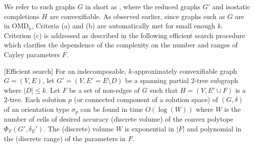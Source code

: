 
We refer to such graphs $G$ in short as , where the reduced graphs $G'$ and isostatic completions $H$ are convexifiable. As observed earlier, since graphs such as $G$ are in OMD$_k$, Criteria (a) and (b) are automatically met for small enough $k$. Criterion (c) is addressed as described in the following efficient search procedure which clarifies the dependence of the complexity on the number and ranges  of Cayley parameters $F$.

\begin{theorem*}\label{theorem:criterionc}
    [Efficient search]
    For an indecomposable, $k$-approximately convexifiable graph $G = (V,E)$, let $G' = (V,E' =E\setminus D)$ be a spanning partial 2-tree subgraph where $|D| \le  k$. Let  $F$ be a set of non-edges of $G$ such that $H = (V, E'\cup F)$ is a 2-tree. Each solution $p$ (or connected component of a solution space) of $(G,\delta)$ of an orientation type $\sigma_p$ can be found in time $O(\log(W))$ where $W$ is the number of cells of desired accuracy (discrete volume) of the convex polytope $\Phi_F(G',\delta_E')$. The (discrete) volume $W$ is exponential in $|F|$ and polynomial in the (discrete range) of the parameters in $F$.
\end{theorem*}

